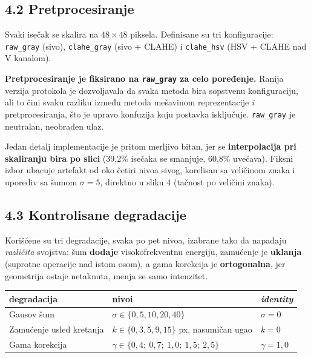 \documentclass[11pt,a4paper]{article}
\begin{document}
\subsection*{4.2 Pretprocesiranje}

Svaki isečak se skalira na $48\times48$ piksela. Definisane su tri konfiguracije:
\texttt{raw\_gray} (sivo), \texttt{clahe\_gray} (sivo + CLAHE) i \texttt{clahe\_hsv} (HSV +
CLAHE nad V kanalom).

\textbf{Pretprocesiranje je fiksirano na \texttt{raw\_gray} za celo poređenje.} Ranija verzija
protokola je dozvoljavala da svaka metoda bira sopstvenu konfiguraciju, ali to čini svaku
razliku između metoda mešavinom reprezentacije \emph{i} pretprocesiranja, što je upravo
konfuzija koju postavka isključuje. \texttt{raw\_gray} je neutralan, neobrađen ulaz.

Jedan detalj implementacije je pritom merljivo bitan, jer se \textbf{interpolacija pri
skaliranju bira po
slici} (39,2\% isečaka se smanjuje, 60,8\% uvećava). Fiksni izbor ubacuje artefakt od oko
četiri nivoa sivog, korelisan sa veličinom znaka i uporediv sa šumom $\sigma=5$,
direktno u sliku 4 (tačnost po veličini znaka).

\subsection*{4.3 Kontrolisane degradacije}

Korišćene su tri degradacije, svaka po pet nivoa, izabrane tako da napadaju \emph{različita}
svojstva:
šum \textbf{dodaje} visokofrekventnu energiju, zamućenje je \textbf{uklanja} (suprotne
operacije nad istom osom), a gama korekcija je \textbf{ortogonalna}, jer geometrija ostaje
netaknuta, menja se samo intenzitet.

\begin{center}
\begin{tabular}{lll}
\toprule
\textbf{degradacija} & \textbf{nivoi} & \textit{\textbf{identity}} \\
\midrule
Gausov šum & $\sigma \in \{0, 5, 10, 20, 40\}$ & $\sigma = 0$ \\
Zamućenje usled kretanja & $k \in \{0, 3, 5, 9, 15\}$ px, nasumičan ugao & $k = 0$ \\
Gama korekcija & $\gamma \in \{0{,}4;\ 0{,}7;\ 1{,}0;\ 1{,}5;\ 2{,}5\}$ & $\gamma = 1{,}0$ \\
\bottomrule
\end{tabular}
\end{center}
\end{document}
